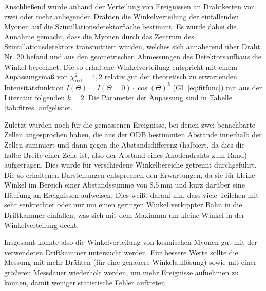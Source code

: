 Anschließend wurde anhand der Verteilung von Ereignissen an Drahtketten von zwei oder mehr anliegenden Drähten die Winkelverteilung der einfallenden Myonen auf die Szintillationsdetektorfläche bestimmt. Es wurde dabei die Annahme gemacht, dass die Myonen durch das Zentrum des Szintillationsdetektors transmittiert wurden, welches sich annäherend über Draht Nr. 20 befand und aus den geometrischen Abmessungen des Detektorsaufbaus die Winkel berechnet. Die so erhaltene Winkelverteilung entspricht mit einem Anpassungsmaß von $\chi^2_\text{red}=4,2$ relativ gut der theoretisch zu erwartenden Intensitätsfunktion $I(\Theta) = I(\Theta = 0) \cdot \cos(\Theta)^k$ (Gl. \eqref{eq:fitfunc}) mit aus der Literatur folgenden $k=2$. Die Parameter der Anpassung sind in Tabelle \ref{tab:fitres} aufgelistet.

Zuletzt wurden noch für die gemessenen Ereignisse, bei denen zwei benachbarte Zellen angesprochen haben, die aus der ODB bestimmten Abstände innerhalb der Zellen summiert und dann gegen die Abstandsdifferenz (halbiert, da dies die halbe Breite einer Zelle ist, also der Abstand eines Anodendrahts zum Rand) aufgetragen. Dies wurde für verschiedene Winkelbereiche getrennt durchgeführt. Die so erhaltenen Darstellungen entsprechen den Erwartungen, da sie für kleine Winkel im Bereich einer Abstandssumme von $\SI{8.5}{\milli\meter}$ und kurz darüber eine Häufung an Ereignissen aufweisen. Dies weißt darauf hin, dass viele Teilchen mit sehr senkrechter oder nur um einen geringen Winkel verkippter Bahn in die Driftkammer einfallen, was sich mit dem Maximum um kleine Winkel in der Winkelverteilung deckt.

Insgesamt konnte also die Winkelverteilung von kosmischen Myonen gut mit der verwendeten Driftkammer untersucht werden. Für bessere Werte sollte die Messung mit mehr Drähten (für eine genauere Winkelauflösung) sowie mit einer größeren Messdauer wiederholt werden, um mehr Ereignisse aufnehmen zu können, damit weniger statistische Fehler auftreten.
